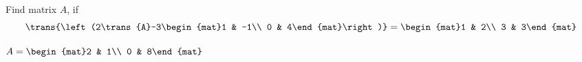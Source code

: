 
\begin{Exercise}[
name={},
title={}, 
difficulty=0,
origin={\cite{CR}}]
Find matrix $A$, if
\[
\trans{\left(2\trans{A}-3\begin{mat}1 & -1\\ 0 & 4\end{mat}\right)}=\begin{mat}1 & 2\\ 3 & 3\end{mat}
\]
\end{Exercise}

\begin{Answer}
$A=\begin{mat}2 & 1\\ 0 & 8\end{mat}$
\end{Answer}
